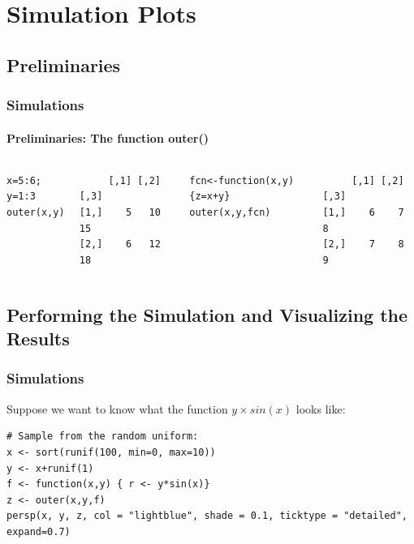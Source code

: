 

\section{Simulation Plots}
\subsection{Preliminaries}

\begin{frame}[fragile]
\frametitle{Simulations}
\framesubtitle{Preliminaries: The function \ttfamily outer() \normalfont}

    \begin{columns}[Tc]
\begin{lstlisting}
x=5:6; y=1:3
outer(x,y)
\end{lstlisting}

\begin{beamerboxesrounded}[shadow=true]{}
\ttfamily
\begin{verbatim}
     [,1] [,2] [,3] 
[1,]    5   10   15 
[2,]    6   12   18 
\end{verbatim}
\end{beamerboxesrounded}
\normalfont

\begin{lstlisting}
fcn<-function(x,y){z=x+y}
outer(x,y,fcn)
\end{lstlisting}

\begin{beamerboxesrounded}[shadow=true]{}
\ttfamily
\begin{verbatim}
     [,1] [,2] [,3] 
[1,]    6    7    8 
[2,]    7    8    9 
\end{verbatim}
\end{beamerboxesrounded}
\normalfont
	\end{columns}
\end{frame}

\subsection{Performing the Simulation and Visualizing the Results}
\begin{frame}[fragile]
\frametitle{Simulations}
Suppose we want to know what the function $y\times sin(x)$ looks like:

\begin{lstlisting}
# Sample from the random uniform:
x <- sort(runif(100, min=0, max=10))
y <- x+runif(1)
f <- function(x,y) { r <- y*sin(x)}
z <- outer(x,y,f)
persp(x, y, z, col = "lightblue", shade = 0.1, ticktype = "detailed", expand=0.7)
\end{lstlisting}
\end{frame}

